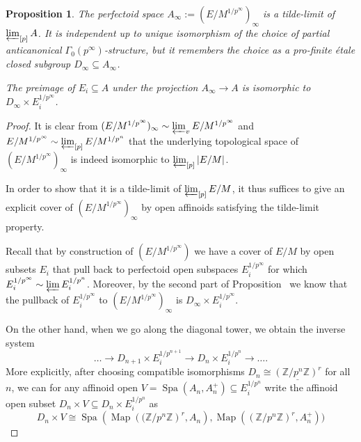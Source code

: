\documentclass[10pt,oneside]{amsart}
\newtheorem{proposition}[theorem]{Proposition}
\theoremstyle{definition}
\begin{document}
	\begin{proposition}\label{tilde-limit of tilde-limits of partial towers is tilde-limit of whole tower}
		The perfectoid space  $A_\infty:=(E/M^{1/p^\infty})_\infty$ is a tilde-limit of $\varprojlim_{[p]}A$.	It is independent up to unique isomorphism of the choice of partial anticanonical $\Gamma_0(p^\infty)$-structure, but it remembers the choice as a pro-finite \'etale closed subgroup $D_\infty \subseteq A_\infty$. 
		
		The preimage of $E_i\subseteq A$ under the projection $A_\infty \rightarrow A$ is isomorphic to $D_\infty \times E_i^{1/p^\infty}$.
	\end{proposition}
	\begin{proof}
	It is clear from $(E/M^{1/p^\infty})_\infty \sim \varprojlim_v E/M^{1/p^\infty}$ and $E/M^{1/p^\infty}\sim \varprojlim_{[p]} E/M^{1/p^n}$ that the underlying topological space of $(E/M^{1/p^\infty})_\infty$ is indeed isomorphic to $\varprojlim_{[p]}|E/M|$.

	In order to show that it is a tilde-limit of $\varprojlim_{[p]}E/M$, it thus suffices to give an explicit cover of $(E/M^{1/p^\infty})_\infty$ by open affinoids satisfying the tilde-limit property. 
	
	Recall that by construction of $(E/M^{1/p^\infty})$ we have a cover of $E/M$ by open subsets $E_i$ that pull back to perfectoid open subspaces $E_i^{1/p^\infty}$ for which $E_i^{1/p^\infty}\sim \varprojlim E_i^{1/p^n}$.
	 Moreover, by the second part of Proposition~\label{horizontal etale map pulls back to vertical limit} we know that the pullback of $E_i^{1/p^\infty}$ to $(E/M^{1/p^\infty})_\infty$ is $D_\infty \times E_i^{1/p^\infty}$. 
	 
	 On the other hand, when we go along the diagonal tower, we obtain the inverse system 
	 \[\dots\rightarrow D_{n+1}\times E_i^{1/p^{n+1}}\rightarrow D_{n}\times E_i^{1/p^{n}}\rightarrow \dots.\]
	 More explicitly, after choosing compatible isomorphisms $D_n\cong \underline{(\mathbb Z/p^n\mathbb Z)^r}$ for all $n$, we can for any affinoid open $V=\operatorname{Spa}(A_n,A_n^{+})\subseteq E_i^{1/p^{n}}$ write the affinoid open subset $D_n\times V\subseteq D_n\times E_i^{1/p^{n}}$ as
	 \[D_{n}\times V \cong \operatorname{Spa}(\operatorname{Map}(\mathbb (\mathbb Z/p^n\mathbb Z)^r,A_n),\operatorname{Map}((\mathbb Z/p^n\mathbb Z)^r,A_n^{+}))\]
	 

\end{proof}
\end{document}
